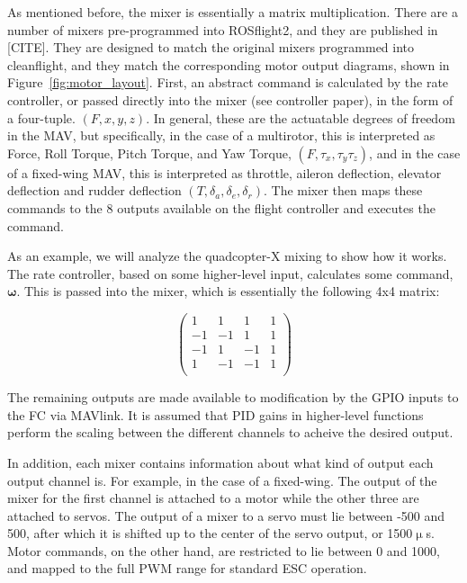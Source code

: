 \documentclass[paper=a4, fontsize=11pt]{scrartcl} %
\begin{document}
As mentioned before, the mixer is essentially a matrix multiplication.  There are a number of mixers pre-programmed into ROSflight2, and they are published in [CITE].  They are designed to match the original mixers programmed into cleanflight, and they match the corresponding motor output diagrams, shown in Figure~\ref{fig:motor_layout}. First, an abstract command is calculated by the rate controller, or passed directly into the mixer (see controller paper), in the form of a four-tuple.  $(F, x, y, z)$.  In general, these are the actuatable degrees of freedom in the MAV, but specifically, in the case of a multirotor, this is interpreted as Force, Roll Torque, Pitch Torque, and Yaw Torque, $(F, \tau_x, \tau_y \tau_z)$, and in the case of a fixed-wing MAV, this is interpreted as throttle, aileron deflection, elevator deflection and rudder deflection $(T, \delta_a, \delta_e, \delta_r)$.  The mixer then maps these commands to the 8 outputs available on the flight controller and executes the command.

As an example, we will analyze the quadcopter-X mixing to show how it works.  The rate controller, based on some higher-level input, calculates some command, $\bm{\omega}$.  This is passed into the mixer, which is essentially the following 4x4 matrix:

\begin{equation}
	\begin{pmatrix}
		 1 & 1 & 1 & 1 \\
	  -1 &-1 & 1 & 1 \\
	  -1 & 1 &-1 & 1 \\
	   1 &-1 &-1 & 1 \\
	\end{pmatrix}
\end{equation}

The remaining outputs are made available to modification by the GPIO inputs to the FC via MAVlink.  It is assumed that PID gains in higher-level functions perform the scaling between the different channels to acheive the desired output.

In addition, each mixer contains information about what kind of output each output channel is.  For example, in the case of a fixed-wing.  The output of the mixer for the first channel is attached to a motor while the other three are attached to servos.  The output of a mixer to a servo must lie between -500 and 500, after which it is shifted up to the center of the servo output, or 1500$\upmu$s.  Motor commands, on the other hand, are restricted to lie between 0 and 1000, and mapped to the full PWM range for standard ESC operation.
\end{document}
